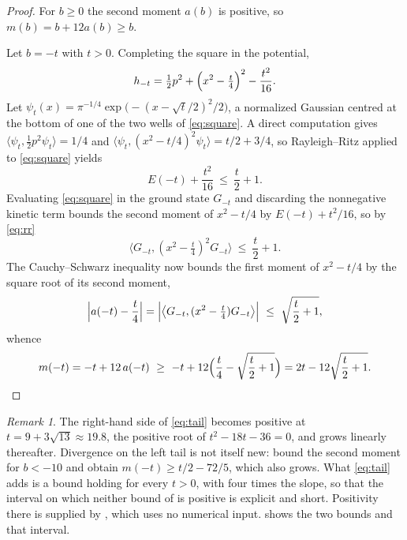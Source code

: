 \documentclass[11pt,reqno]{amsart}
\theoremstyle{plain}
\theoremstyle{definition}
\theoremstyle{remark}
\newtheorem{remark}[theorem]{Remark}
\numberwithin{equation}{section}
\begin{document}
\begin{proof}
  For $b\ge0$ the second moment $a(b)$ is positive, so $m(b)=b+12a(b)\ge b$.

  Let $b=-t$ with $t>0$. Completing the square in the potential,
  \begin{equation}
    \label{eq:square}
    h_{-t}=\tfrac12p^2+\Bigl(x^2-\tfrac t4\Bigr)^2-\frac{t^2}{16}.
  \end{equation}
  Let $\psi_t(x)=\pi^{-1/4}\exp\bigl(-(x-\sqrt t/2)^2/2\bigr)$, a normalized
  Gaussian centred at the bottom of one of the two wells of \eqref{eq:square}.
  A direct computation gives $\langle\psi_t,\tfrac12p^2\psi_t\rangle=1/4$ and
  $\langle\psi_t,(x^2-t/4)^2\psi_t\rangle=t/2+3/4$, so Rayleigh--Ritz applied
  to \eqref{eq:square} yields
  \begin{equation}
    \label{eq:rr}
    E(-t)+\frac{t^2}{16}\ \le\ \frac t2+1 .
  \end{equation}
  Evaluating \eqref{eq:square} in the ground state $G_{-t}$ and discarding
  the nonnegative kinetic term bounds the second moment of $x^2-t/4$ by
  $E(-t)+t^2/16$, so by \eqref{eq:rr}
  \begin{equation*}
    \bigl\langle G_{-t},(x^2-\tfrac t4)^2G_{-t}\bigr\rangle\ \le\ \frac t2+1 .
  \end{equation*}
  The Cauchy--Schwarz inequality now bounds the first moment of $x^2-t/4$ by
  the square root of its second moment,
  \begin{equation*}
    \Bigl|a(-t)-\frac t4\Bigr|
    =\Bigl|\bigl\langle G_{-t},(x^2-\tfrac t4)G_{-t}\bigr\rangle\Bigr|
    \ \le\ \sqrt{\frac t2+1},
  \end{equation*}
  whence
  \begin{equation*}
    m(-t)=-t+12\,a(-t)
    \ \ge\ -t+12\Bigl(\frac t4-\sqrt{\frac t2+1}\Bigr)
    =2t-12\sqrt{\frac t2+1}. \qedhere
  \end{equation*}
\end{proof}

\begin{remark}
  \label{rem:tail}
  The right-hand side of \eqref{eq:tail} becomes positive at
  $t=9+3\sqrt{13}\approx19.8$, the positive root of $t^2-18t-36=0$, and grows
  linearly thereafter. Divergence on the left tail is not itself new:
  \cite{baez1992renormalized} bound the second moment for $b<-10$ and obtain
  $m(-t)\ge t/2-72/5$, which also grows. What \eqref{eq:tail} adds is a bound
  holding for every $t>0$, with four times the slope, so that the interval on
  which neither bound of  is positive is explicit and
  short. Positivity there is supplied by , which uses no
  numerical input.  shows the two bounds and that interval.
\end{remark}
\end{document}
